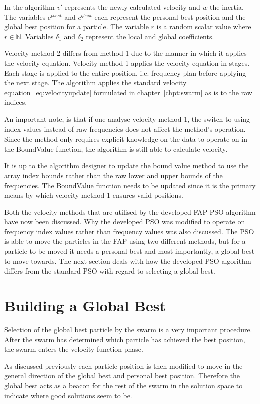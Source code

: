 In the algorithm $v'$ represents the newly calculated velocity and $w$ the inertia. The variables $c^{pbest}$ and $c^{gbest}$ each represent the personal best position and the global best position for a particle. The variable $r$ is a random scalar value where $r \in \mathbb{N}$. Variables $\delta_1$ and $\delta_2$ represent the local and global coefficients.

Velocity method 2 differs from method 1 due to the manner in which it applies the velocity equation. Velocity method 1 applies the velocity equation in stages. Each stage is applied to the entire position, i.e. frequency plan before applying the next stage. The algorithm applies the standard velocity equation~\ref{eq:velocityupdate} formulated in chapter~\ref{chpt:swarm} as is to the raw indices.

An important note, is that if one analyse velocity method 1, the switch to using index values instead of raw frequencies does not affect the method's operation. Since the method only requires explicit knowledge on the data to operate on in the BoundValue function, the algorithm is still able to calculate velocity. 

It is up to the algorithm designer to update the bound value method to use the array index bounds rather than the raw lower and upper bounds of the frequencies. The BoundValue function needs to be updated since it is the primary means by which velocity method 1 ensures valid positions.

Both the velocity methods that are utilised by the developed \gls{FAP} \gls{PSO} algorithm have now been discussed. Why the developed \gls{PSO} was modified to operate on frequency index values rather than frequency values was also discussed. The \gls{PSO} is able to move the particles in the \gls{FAP} using two different methods, but for a particle to be moved it needs a personal best and most importantly, a global best to move towards. The next section deals with how the developed \gls{PSO} algorithm differs from the standard \gls{PSO} with regard to selecting a global best.
\section{Building a Global Best}
\label{sec:buildglobalbest}
Selection of the global best particle by the swarm is a very important procedure. After the swarm has determined which particle has achieved the best position, the swarm enters the velocity function phase. 

As discussed previously each particle position is then modified to move in the general direction of the global best and personal best position. Therefore the global best acts as a beacon for the rest of the swarm in the solution space to indicate where good solutions seem to be.

